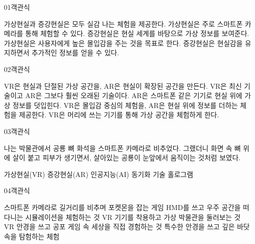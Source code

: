 \documentclass[fs85,seriesRus]{korfarm-base}
\begin{document}
\par\medskip
\kfBeginMC
\begin{kfQBlock}{01}{객관식}
\begin{kfChoices}
\kfChoice 가상현실과 증강현실은 모두 실감 나는 체험을 제공한다.
\kfChoice 가상현실은 주로 스마트폰 카메라를 통해 체험할 수 있다.
\kfChoice 증강현실은 현실 세계를 바탕으로 가상 정보를 보여준다.
\kfChoice 가상현실은 사용자에게 높은 몰입감을 주는 것을 목표로 한다.
\kfChoice 증강현실은 현실감을 유지하면서 추가적인 정보를 얻을 수 있다.
\end{kfChoices}
\end{kfQBlock}
\begin{kfQBlock}{02}{객관식}
\begin{kfChoices}
\kfChoice VR은 현실과 단절된 가상 공간을, AR은 현실이 확장된 공간을 만든다.
\kfChoice VR은 최신 기술이고 AR은 그보다 훨씬 오래된 기술이다.
\kfChoice AR은 스마트폰 같은 기기로 현실 위에 가상 정보를 덧입힌다.
\kfChoice VR은 몰입감 중심의 체험을, AR은 현실 위에 정보를 더하는 체험을 제공한다.
\kfChoice VR은 머리에 쓰는 기기를 통해 가상 공간을 체험하게 한다.
\end{kfChoices}
\end{kfQBlock}
\begin{kfQBlock}{03}{객관식}
\begin{kfEvidence}나는 박물관에서 공룡 뼈 화석을 스마트폰 카메라로 비추었다. 그랬더니 화면 속 뼈 위에 살이 붙고 피부가 생기면서, 살아있는 공룡이 눈앞에서 움직이는 것처럼 보였다.\end{kfEvidence}
\begin{kfChoices}
\kfChoice 가상현실(VR)
\kfChoice 증강현실(AR)
\kfChoice 인공지능(AI)
\kfChoice 동기화 기술
\kfChoice 홀로그램
\end{kfChoices}
\end{kfQBlock}
\begin{kfQBlock}{04}{객관식}
\begin{kfChoices}
\kfChoice 스마트폰 카메라로 길거리를 비추며 포켓몬을 잡는 게임
\kfChoice HMD를 쓰고 우주 공간을 떠다니는 시뮬레이션을 체험하는 것
\kfChoice VR 기기를 착용하고 가상 박물관을 둘러보는 것
\kfChoice VR 안경을 쓰고 공포 게임 속 세상을 직접 경험하는 것
\kfChoice 특수한 안경을 쓰고 깊은 바닷속을 탐험하는 체험
\end{kfChoices}
\end{kfQBlock}
\end{document}
